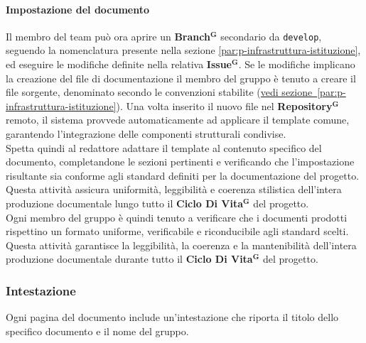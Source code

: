 \documentclass[a4paper,12pt]{article}
\newcommand{\term}[1]{\textbf{#1}$^\mathbf{G}$}
\begin{document}
\paragraph{Impostazione del documento}
Il membro del team può ora aprire un \term{Branch} secondario da \texttt{develop}, seguendo la nomenclatura presente nella sezione \ref{par:p-infrastruttura-istituzione}, ed eseguire le modifiche definite nella relativa \term{Issue}. 
Se le modifiche implicano la creazione del file di documentazione il membro del gruppo è tenuto a creare il file sorgente, denominato secondo le convenzioni stabilite (\hyperref[par:p-infrastruttura-istituzione]{vedi sezione~\ref*{par:p-infrastruttura-istituzione}}). Una volta inserito il nuovo file nel \term{Repository} remoto, il sistema provvede automaticamente ad applicare il template comune, garantendo l’integrazione delle componenti strutturali condivise.
\\Spetta quindi al redattore adattare il template al contenuto specifico del documento, completandone le sezioni pertinenti e verificando che l’impostazione risultante sia conforme agli standard definiti per la documentazione del progetto. Questa attività assicura uniformità, leggibilità e coerenza stilistica dell’intera produzione documentale lungo tutto il \term{Ciclo Di Vita} del progetto.
\\Ogni membro del gruppo è quindi tenuto a verificare che i documenti prodotti rispettino un formato uniforme, verificabile e riconducibile agli standard scelti.\\ Questa attività garantisce la leggibilità, la coerenza e la mantenibilità dell’intera produzione documentale durante tutto il \term{Ciclo Di Vita} del progetto.

\subsubsection*{Intestazione}
Ogni pagina del documento include un'intestazione che riporta il titolo dello specifico documento e il nome del gruppo.
\end{document}

